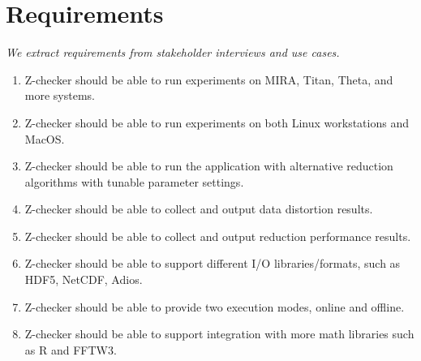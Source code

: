 \section{Requirements}

\emph{We extract requirements from stakeholder interviews and use cases.}

\begin{enumerate}[label=R-\arabic*)]
\item
Z-checker should be able to run experiments on MIRA, Titan, Theta, and more systems.
\item
Z-checker should be able to run experiments on both Linux workstations and MacOS.
\item
Z-checker should be able to run the application with alternative reduction algorithms with tunable parameter settings.
\item
Z-checker should be able to collect and output data distortion results.
\item 
Z-checker should be able to collect and output reduction performance results.
\item 
Z-checker should be able to support different I/O libraries/formats, such as HDF5, NetCDF, Adios.
\item
Z-checker should be able to provide two execution modes, online and offline. 
\item
Z-checker should be able to support integration with more math libraries such as R and FFTW3. 
\end{enumerate}

